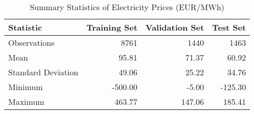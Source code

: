 \begin{table}[htbp]
\centering
\caption{Summary Statistics of Electricity Prices (EUR/MWh)}
\begin{tabular}{lrrr}
\hline
Statistic & Training Set & Validation Set & Test Set \\
\hline
Observations & 8761 & 1440 & 1463 \\
Mean & 95.81 & 71.37 & 60.92 \\
Standard Deviation & 49.06 & 25.22 & 34.76 \\
Minimum & -500.00 & -5.00 & -125.30 \\
Maximum & 463.77 & 147.06 & 185.41 \\
\hline
\end{tabular}
\label{tab:price_summary_stats}
\end{table}